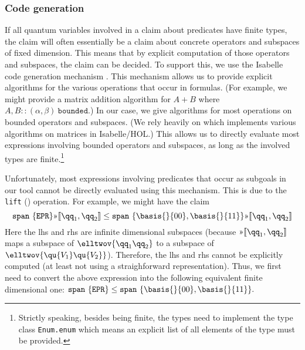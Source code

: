\documentclass{article}
\begin{document}
\subsubsection{Code generation}
If all quantum variables involved in a
claim about predicates have finite types, the claim will often
essentially be a claim about concrete operators and subspaces of fixed
dimension. This means that by explicit computation of those operators and
subspaces, the claim can be decided. To support this, we use the
Isabelle code generation mechanism 
\cite{isabelle-codegen}. This mechanism allows us to provide explicit
algorithms for the various operations that occur in formulas. (For
example, we might provide a matrix addition algorithm for $A+B$
where $A,B::(\alpha,\beta)\ \mathtt{bounded}$.)
In our case, we give algorithms for most operations on bounded
operators and subspaces. (We rely heavily on \cite{Jordan_Normal_Form-AFP} which
implements various algorithms on matrices in Isabelle/HOL.) This
allows us to directly evaluate most expressions involving bounded
operators and subspaces, as long as the involved types are
finite.\footnote{Strictly speaking, besides being finite, the types need to implement the
  type class \texttt{Enum.enum} which means an explicit list of all
  elements of the type must be provided.}

Unfortunately, most expressions involving predicates that occur as
subgoals in our tool cannot be directly evaluated using this
mechanism. This is due to the \texttt{lift} (\guillemotright) operation. For example, we
might have the claim
\begin{equation}
  \label{eq:code1}
  \mathtt{span}\ \{\mathtt{EPR}\} \text\guillemotright \llbracket \qq_1,\qq_2\rrbracket
  \leq
  \mathtt{span}\ \{\basis{}{00},\basis{}{11}\} \text\guillemotright \llbracket{\qq_1,\qq_2}\rrbracket
\end{equation}
Here the lhs and rhs are infinite dimensional subspaces (because
$\text\guillemotright \llbracket \qq_1,\qq_2\rrbracket$
maps a subspace of $\elltwov{\qq_1\qq_2}$
to a subspace of $\elltwov{\qu{V_1}\qu{V_2}}$).
Therefore, the lhs and rhs cannot be explicitly computed (at least not
using a straighforward representation). Thus, we first need to convert
the above expression into the following equivalent finite dimensional
one:
$ \mathtt{span}\ \{\mathtt{EPR}\} \leq \mathtt{span}\
\{\basis{}{00},\basis{}{11}\}.  $
\end{document}
